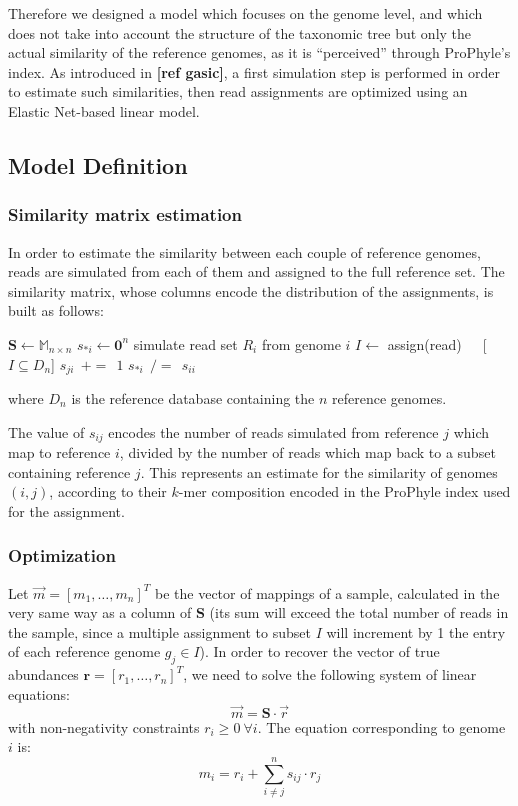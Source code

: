 Therefore we designed a model which focuses on the genome level, and which does not take into account the structure of the taxonomic tree but only the actual similarity of the reference genomes, as it is ``perceived'' through ProPhyle's index. As introduced in \textbf{[ref gasic]}, a first simulation step is performed in order to estimate such similarities, then read assignments are optimized using an Elastic Net-based linear model.

\subsection{Model Definition}

\subsubsection{Similarity matrix estimation}
In order to estimate the similarity between each couple of reference genomes, reads are simulated from each of them and assigned to the full reference set. The similarity matrix, whose columns encode the distribution of the assignments, is built as follows:
\begin{algorithmic}
\State $\mathbf{S} \gets \mathbb{M}_{n\times n}$
\State $s_{*i} \gets \mathbf{0}^n$
\State simulate read set $R_i$ from genome $i$
\State $I \gets$ assign(read)~~~[$I \subseteq D_n$]
\State $s_{ji}~~{+=}~~1$
\EndFor
\EndFor
$s_{*i}~~{/=}~~s_{ii}$
\EndFor
\end{algorithmic}
where $D_n$ is the reference database containing the $n$ reference genomes.

The value of $s_{ij}$ encodes the number of reads simulated from reference $j$ which map to reference $i$, divided by the number of reads which map back to a subset containing reference $j$. This represents an estimate for the similarity of genomes $(i,j)$, according to their $k$-mer composition encoded in the ProPhyle index used for the assignment.

\subsubsection{Optimization}
Let $\vec{m} = [m_1, \dots, m_n]^T$ be the vector of mappings of a sample, calculated in the very same way as a column of $\boldsymbol{S}$ (its sum will exceed the total number of reads in the sample, since a multiple assignment to subset $I$  will increment by 1 the entry of each reference genome $g_j \in I$). In order to recover the vector of true abundances $\mathbf{r} = [r_1, \dots, r_n]^T$, we need to solve the following system of linear equations:
\begin{equation*}
  \vec{m} = \boldsymbol{S} \cdot \vec{r}
\end{equation*}
with non-negativity constraints $r_i \geq 0~\forall i$. The equation corresponding to genome $i$ is:
\begin{equation*}
  m_i = r_i + \sum_{i \neq j}^n s_{ij} \cdot r_j
\end{equation*}

